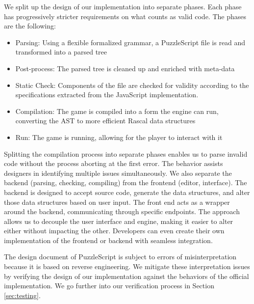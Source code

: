 We split up the design of our implementation into separate phases\dd. Each phase has progressively stricter requirements on what counts as valid code. The phases are the following:
\begin{itemize}
    \item Parsing: Using a flexible formalized grammar, a PuzzleScript file is read and transformed into a parsed tree
    \item Post-process: The parsed tree is cleaned up and enriched with meta-data
    \item Static Check: Components of the file are checked for validity according to the specifications extracted from the JavaScript implementation.
    \item Compilation: The game is compiled into a form the engine can run, converting the AST to more efficient Rascal data structures
    \item Run: The game is running, allowing for the player to interact with it
\end{itemize}

Splitting the compilation process into separate phases enables us to parse invalid code without the process aborting at the first error. The behavior assists designers in identifying multiple issues simultaneously.  We also separate the backend (parsing, checking, compiling) from the frontend (editor, interface)\dd. The backend is designed to accept source code, generate the data structures, and alter those data structures based on user input. The front end acts as a wrapper around the backend, communicating through specific endpoints. The approach allows us to decouple the user interface and engine, making it easier to alter either without impacting the other. Developers can even create their own implementation of the frontend or backend with seamless integration.

The design document of PuzzleScript is subject to errors of misinterpretation because it is based on reverse engineering. We mitigate these interpretation issues by verifying the design of our implementation against the behaviors of the official implementation. We go further into our verification process in Section \ref{sec:testing}.







